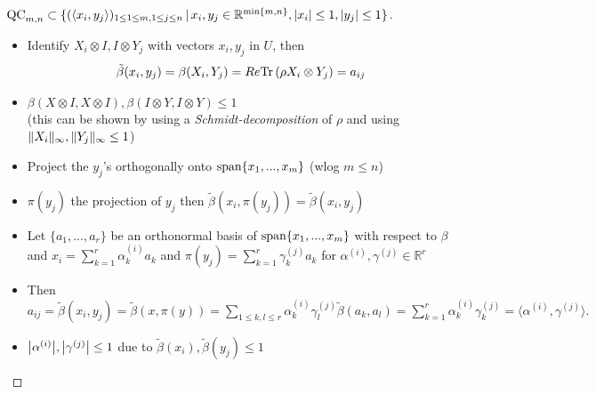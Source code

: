 \begin{frame}
	\begin{proof}[$ \textup{QC}_{m,n} \subset \{ (\langle x_i,y_j \rangle)_{1 \le 1 \le m, 1 \le j \le n} \,| \, x_i,y_j \in \mathbb{R}^{ \min \{m,n \} }, \vert x_i  \vert \le 1, \vert y_j \vert \le 1  \} $]
		\begin{itemize}
			\item<1-> {\footnotesize Identify $ X_i \otimes I,I \otimes Y_j $ with vectors $ x_i,y_j $ in $ U $, then 
			\begin{align*}
			\tilde{\beta}(x_i,y_j) = \beta(X_i,Y_j) = Re \text{Tr} \, {(\rho X_i \otimes Y_j)}  = a_{ij}
			\end{align*}}
			\item<2-> $ \beta (X \otimes I, X \otimes I), \beta (I \otimes Y, I \otimes Y) \le 1$ \\
			(this can be shown by using a {\itshape Schmidt-decomposition} of $ \rho $ and using $  \Vert {X_i} \Vert_{\infty},  \Vert {Y_j} \Vert_{\infty} \le 1 $)
			\item<3-> Project the $ y_j $'s orthogonally onto $ \textup{span} \{ x_1,...,x_m \} $  (wlog $ m \le n $)
			\item<4-> $ \pi(y_j) $ the projection of $ y_j $ then $ \tilde{\beta}(x_i,\pi(y_j)) = \tilde{\beta}(x_i,y_j) $
			\item<5-> Let $ \{a_1,...,a_r\} $ be an orthonormal basis of $ \textup{span} \{ x_1,...,x_m \} $ with respect to $ \beta $ and 
			$ x_i = \sum_{k=1}^{r}\alpha_k^{(i)}a_k$ and $  \pi(y_j) = \sum_{k=1}^r \gamma_k^{(j)} a_k$ for $ \alpha^{(i)}, \gamma^{(j)} \in \mathbb{R}^r $
			\item<6-> Then $
			a_{ij}= \tilde{\beta}(x_i,y_j)= \tilde{\beta}(x,\pi(y)) = \sum_{1 \le k,l \le r} \alpha_k^{(i)} \gamma_l^{(j)} \tilde{\beta}(a_k,a_l) 
			= \sum_{k=1}^{r}\alpha_k^{(i)}\gamma_k^{(j)} = \langle \alpha^{(i)}, \gamma^{(j)} \rangle. $
			\item<7-> $ {\left|{\alpha^{(i)}}\right|}, {\left|{\gamma^{(j)}}\right|} \le 1  $ due to $ \tilde{\beta}(x_i), \tilde{\beta}(y_j) \le 1 $
		\end{itemize}
		
	\end{proof}
\end{frame}


